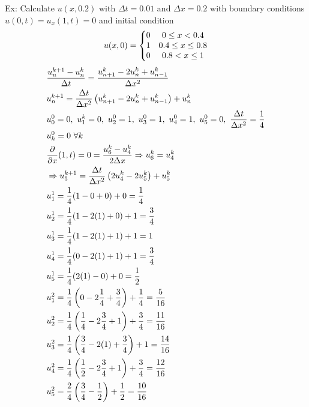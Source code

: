 \documentclass[11pt, fleqn]{article}
\begin{document}
Ex: Calculate $u(x,0.2)$ with $\Delta t=0.01$ and $\Delta x=0.2$ with boundary conditions $u(0,t)=u_x(1,t)=0$ and initial condition
$$u(x,0)=\left\{\begin{matrix} 0 & 0\leq x< 0.4\\1 & 0.4\leq x \leq 0.8\\0 & 0.8<x\leq 1 \end{matrix}\right.$$
\begin{align*}
    &\frac{u_n^{k+1}-u_n^k}{\Delta t}=\frac{u_{n+1}^k-2u_n^k+u_{n-1}^k}{\Delta x^2}\\
    &u_n^{k+1}=\frac{\Delta t}{\Delta x^2}\brround{u_{n+1}^k-2u_n^k+u_{n-1}^k}+u_n^k\\
    &u_0^0=0,\ u_1^k=0,\ u_2^0=1,\ u_3^0=1,\ u_4^0=1,\ u_5^0=0,\ \frac{\Delta t}{\Delta x^2}=\frac{1}{4}\\
    &u_k^0=0\ \forall k\\
    &\frac{\partial}{\partial x}(1,t)=0=\frac{u_6^k-u_4^k}{2\Delta x}\Ra u_6^k=u_4^k\\
    &\Ra u_5^{k+1}=\frac{\Delta t}{\Delta x^2}\brround{2u_4^k-2u_5^k}+u_5^k\\
    &u_1^1=\frac{1}{4}(1-0+0)+0=\frac{1}{4}\\
    &u_2^1=\frac{1}{4}(1-2(1)+0)+1=\frac{3}{4}\\
    &u_3^1=\frac{1}{4}(1-2(1)+1)+1=1\\
    &u_4^1=\frac{1}{4}(0-2(1)+1)+1=\frac{3}{4}\\
    &u_5^1=\frac{1}{4}(2(1)-0)+0=\frac{1}{2}\\
    &u_1^2=\frac{1}{4}\brround{0-2\frac{1}{4}+\frac{3}{4}}+\frac{1}{4}=\frac{5}{16}\\
    &u_2^2=\frac{1}{4}\brround{\frac{1}{4}-2\frac{3}{4}+1}+\frac{3}{4}=\frac{11}{16}\\
    &u_3^2=\frac{1}{4}\brround{\frac{3}{4}-2(1)+\frac{3}{4}}+1=\frac{14}{16}\\
    &u_4^2=\frac{1}{4}\brround{\frac{1}{2}-2\frac{3}{4}+1}+\frac{3}{4}=\frac{12}{16}\\
    &u_5^2=\frac{2}{4}\brround{\frac{3}{4}-\frac{1}{2}}+\frac{1}{2}=\frac{10}{16}
\end{align*}
\end{document}
